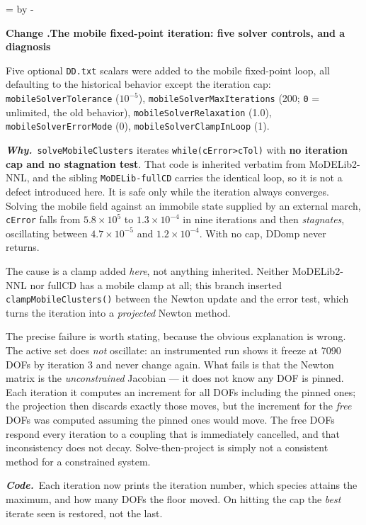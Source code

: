 \documentclass[11pt,a4paper]{article}
\newcommand{\code}[1]{\texttt{\small #1}}
\newcommand{\needlines}[1]{%
  \par\dimen0=\pagegoal \advance\dimen0 by -\pagetotal
  \ifdim\dimen0<#1\baselineskip \newpage \fi}
\newcounter{chg}
\newcommand{\change}[1]{%
  \needlines{4}%
  \refstepcounter{chg}%
  \par\medskip\noindent
  {\bfseries\boldmath Change \thechg.\quad #1}%
  \par\nobreak\smallskip}
\newcommand{\why}[1]{\par\noindent\textbf{\itshape Why.}\ #1\par}
\newcommand{\impact}[1]{\par\noindent\textbf{\itshape Code.}\ #1\par}
\begin{document}
\change{The mobile fixed-point iteration: five solver controls, and a diagnosis}
\label{chg:clamp}
Five optional \code{DD.txt} scalars were added to the mobile fixed-point loop,
all defaulting to the historical behavior except the iteration cap:
\code{mobileSolverTolerance} ($10^{-5}$), \code{mobileSolverMaxIterations}
(200; \code{0} = unlimited, the old behavior), \code{mobileSolverRelaxation}
(1.0), \code{mobileSolverErrorMode} (0), \code{mobileSolverClampInLoop} (1).
\why{\code{solveMobileClusters} iterates \code{while(cError>cTol)} with
\textbf{no iteration cap and no stagnation test}. That code is inherited
verbatim from MoDELib2-NNL, and the sibling \code{MoDELib-fullCD} carries the
identical loop, so it is not a defect introduced here. It is safe only while
the iteration always converges. Solving the mobile
field against an immobile state supplied by an external march, \code{cError}
falls from $5.8\times10^{5}$ to $1.3\times10^{-4}$ in nine iterations and then
\emph{stagnates}, oscillating between $4.7\times10^{-5}$ and
$1.2\times10^{-4}$. With no cap, DDomp never returns.

The cause is a clamp added \emph{here}, not anything inherited. Neither
MoDELib2-NNL nor fullCD has a mobile clamp at all; this branch inserted
\code{clampMobileClusters()} between the Newton update and the error test,
which turns the iteration into a \emph{projected} Newton method.

The precise failure is worth stating, because the obvious explanation is
wrong. The active set does \emph{not} oscillate: an instrumented run shows it
freeze at 7090 DOFs by iteration 3 and never change again. What fails is that
the Newton matrix is the \emph{unconstrained} Jacobian --- it does not know any
DOF is pinned. Each iteration it computes an increment for all DOFs including
the pinned ones; the projection then discards exactly those moves, but the
increment for the \emph{free} DOFs was computed assuming the pinned ones would
move. The free DOFs respond every iteration to a coupling that is immediately
cancelled, and that inconsistency does not decay. Solve-then-project is simply
not a consistent method for a constrained system.}
\impact{Each iteration now prints the iteration number, which species attains
the maximum, and how many DOFs the floor moved. On hitting the cap the
\emph{best} iterate seen is restored, not the last.}
\end{document}
